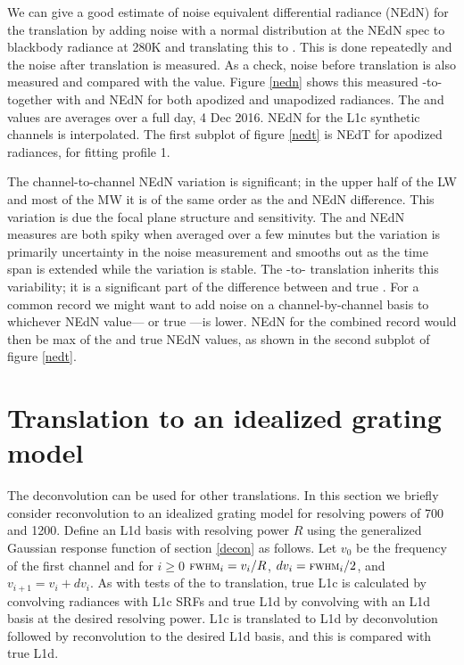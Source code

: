 \documentclass[10pt,twocolumn]{article}
\begin{document}
We can give a good estimate of noise equivalent differential
radiance (NEdN) for the translation by adding noise with a normal
distribution at the {\airs} NEdN spec to blackbody radiance at 280K
and translating this to {\cris}.  This is done repeatedly and the
noise after translation is measured.  As a check, noise before
translation is also measured and compared with the {\airs} value.
Figure \ref{nedn} shows this measured {\airs}-to-{\cris} together
with {\airs} and {\cris} NEdN for both apodized and unapodized
radiances.  The {\airs} and {\cris} values are averages over a full
day, 4 Dec 2016.  NEdN for the L1c synthetic channels is
interpolated.  The first subplot of figure \ref{nedt} is NEdT for
apodized radiances, for fitting profile 1.

The {\airs} channel-to-channel NEdN variation is significant; in the
upper half of the LW and most of the MW it is of the same order as
the {\airs} and {\cris} NEdN difference.  This variation is due the
{\airs} focal plane structure and sensitivity.  The {\airs} and
{\cris} NEdN measures are both spiky when averaged over a few
minutes but the {\cris} variation is primarily uncertainty in the
noise measurement and smooths out as the time span is extended
while the {\airs} variation is stable.  The {\airs}-to-{\cris}
translation inherits this variability; it is a significant part of
the difference between {\airs} {\cris} and true {\cris}.  For a
common record we might want to add noise on a channel-by-channel
basis to whichever NEdN value---{\airs} {\cris} or true {\cris}---is
lower.  NEdN for the combined record would then be max of the
{\airs} {\cris} and true {\cris} NEdN values, as shown in the second
subplot of figure \ref{nedt}.

\section{Translation to an idealized grating model}
\label{airsL1d}


The {\airs} deconvolution can be used for other translations.  
In this section we briefly consider reconvolution to an idealized
grating model for resolving powers of 700 and 1200.  Define an
{\airs} L1d basis with resolving power $R$ using the generalized
Gaussian response function of section \ref{decon} as follows.
Let $v_0$ be the frequency of the first channel and for $i\ge0$
$\mbox{\small\textsc{fwhm}}_i = v_i / R$, $dv_i = \mbox{\small\textsc{fwhm}}_i / 2$, and $v_{i+1} = v_i +
dv_i$.  As with tests of the {\airs} to {\cris} translation, true
L1c is calculated by convolving {\kcarta} radiances with {\airs} L1c
SRFs and true L1d by convolving with an L1d basis at the desired
resolving power.  L1c is translated to L1d by deconvolution followed
by reconvolution to the desired L1d basis, and this is compared with
true L1d.
\end{document}
